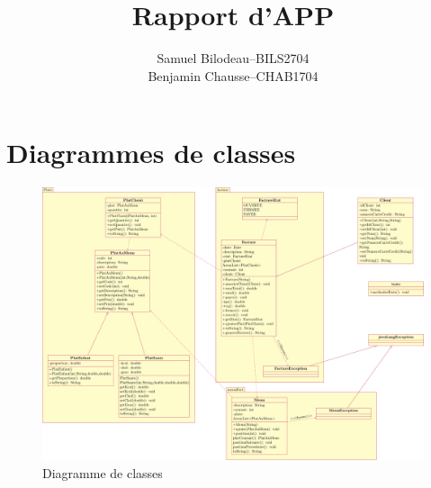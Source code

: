 \documentclass[a11paper, 11pt]{article}
\title{Rapport d'APP}
\author{
  \addtolength{\tabcolsep}{-0.4em}
  \begin{tabular}{rcl} %
  Samuel Bilodeau  & -- & BILS2704 \\ %
  Benjamin Chausse & -- & CHAB1704 \\
  \end{tabular}
}
\begin{document}
\maketitle
\newpage
\tableofcontents
\newpage
\section{Diagrammes de classes}

\begin{figure}[H]
  \centering
  \includegraphics[width=\textwidth]{uml/uml.pdf}
  \caption{Diagramme de classes}
  \label{fig:uml}
\end{figure}




\end{document}
